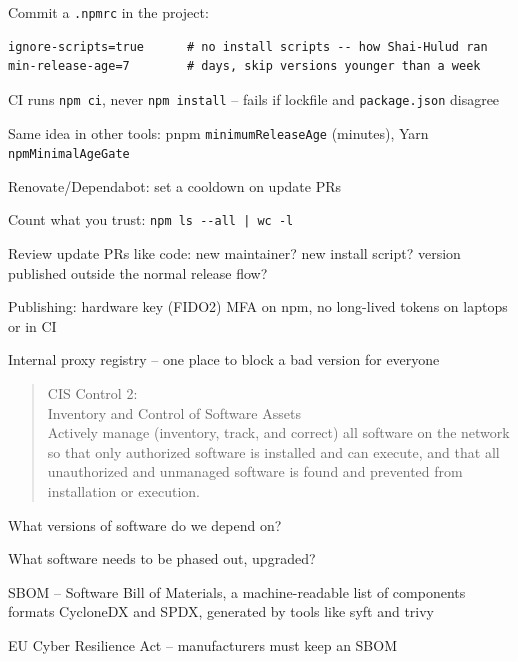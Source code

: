 \documentclass[Screen16to9,17pt]{foils}
\begin{document}
Commit a \verb+.npmrc+ in the project:
\begin{verbatim}
ignore-scripts=true      # no install scripts -- how Shai-Hulud ran
min-release-age=7        # days, skip versions younger than a week
\end{verbatim}

\begin{list2}
\item CI runs \verb+npm ci+, never \verb+npm install+ -- fails if lockfile
      and \verb+package.json+ disagree
\item Same idea in other tools: pnpm \verb+minimumReleaseAge+ (minutes),
      Yarn \verb+npmMinimalAgeGate+
\item Renovate/Dependabot: set a cooldown on update PRs
\end{list2}


\begin{list2}
\item Count what you trust: \verb+npm ls --all | wc -l+
\item Review update PRs like code: new maintainer? new install script?
      version published outside the normal release flow?
\item Publishing: hardware key (FIDO2) MFA on npm, no long-lived tokens on laptops or in CI
\item Internal proxy registry -- one place to block a bad version for everyone
\end{list2}




\begin{quote}
CIS Control 2:\\
Inventory and Control of Software Assets\\
Actively manage (inventory, track, and correct) all software on the network so that only authorized software is installed and can execute, and that all unauthorized and unmanaged software is found and prevented from installation or execution.
\end{quote}

\begin{list1}
\item What versions of software do we depend on?
\item What software needs to be phased out, upgraded?
\item SBOM -- Software Bill of Materials, a machine-readable list of components\\
formats CycloneDX and SPDX, generated by tools like syft and trivy
\item EU Cyber Resilience Act -- manufacturers must keep an SBOM
\end{list1}
\end{document}
